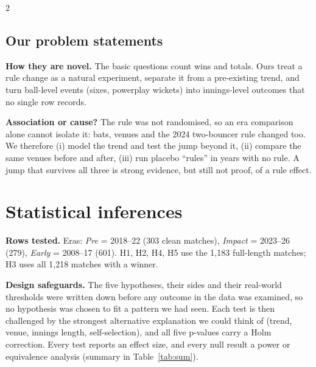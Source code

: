 \documentclass[10pt,a4paper]{article}
\begin{document}
\begin{multicols}{2}
\subsection{Our problem statements}
\noindent{}

\textbf{How they are novel.} The basic questions count wins and totals. Ours treat a rule change as a natural experiment, separate it from a pre-existing trend, and turn ball-level events (sixes, powerplay wickets) into innings-level outcomes that no single row records.

\textbf{Association or cause?} The rule was not randomised, so an era comparison alone cannot isolate it: bats, venues and the 2024 two-bouncer rule changed too. We therefore (i) model the trend and test the jump beyond it, (ii) compare the same venues before and after, (iii) run placebo ``rules'' in years with no rule. A jump that survives all three is strong evidence, but still not proof, of a rule effect.

\section{Statistical inferences}
\textbf{Rows tested.} Eras: \emph{Pre} = 2018--22 (303 clean matches), \emph{Impact} = 2023--26 (279), \emph{Early} = 2008--17 (601). H1, H2, H4, H5 use the 1,183 full-length matches; H3 uses all 1,218 matches with a winner.

\textbf{Design safeguards.} The five hypotheses, their sides and their real-world thresholds were written down before any outcome in the data was examined, so no hypothesis was chosen to fit a pattern we had seen. Each test is then challenged by the strongest alternative explanation we could think of (trend, venue, innings length, self-selection), and all five p-values carry a Holm correction. Every test reports an effect size, and every null result a power or equivalence analysis (summary in Table~\ref{tab:sum}).


\end{multicols}
\end{document}
